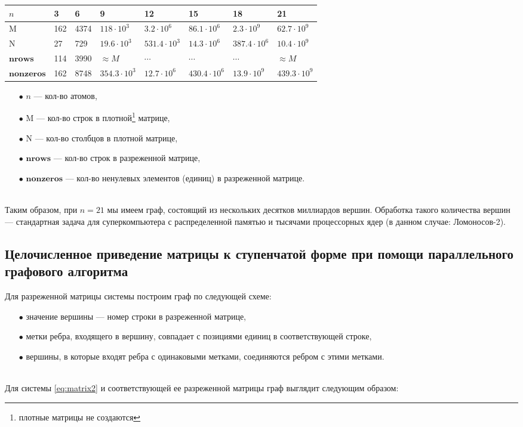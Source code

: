 \noindent
{\footnotesize
	\begin{tabular}[t]{|p{5em}|p{3em}|p{4em}|p{5em}|p{5em}|p{5em}|p{5em}|p{5em}|}
		\hline
		$n$ & 3 & 6 & 9 & 12 & 15 & 18 & 21 \\
		\hline
		$\mathrm{M}$ & 162 & 4374 & $118 \cdot 10^{3}$ & $3.2 \cdot 10^{6}$ & $86.1 \cdot 10^{6}$ & $2.3 \cdot 10^{9}$ & $62.7 \cdot 10^{9}$ \\
		\hline
		$\mathrm{N}$ & 27 & 729 & $19.6 \cdot 10^{3}$ & $531.4 \cdot 10^{3}$ & $14.3 \cdot 10^{6}$ & $387.4 \cdot 10^{6}$ & $10.4 \cdot 10^{9}$ \\
		\hline
		$\mathbf{nrows}$ & 114 & 3990 & $\approx M$ & $\cdots$ & $\cdots$ & $\cdots$ & $\approx M$ \\
		\hline
		$\mathbf{nonzeros}$ & 162 & 8748 & $354.3 \cdot 10^{3}$ & $12.7 \cdot 10^{6}$ & $430.4 \cdot 10^{6}$ & $13.9 \cdot 10^{9}$ & $439.3 \cdot 10^{9}$ \\
		\hline
	\end{tabular}
}

\begin{itemize}
	\item[$\bullet$]{$n$  --- кол-во атомов},
	\item[$\bullet$]{$\mathrm{M}$ --- кол-во строк в плотной\footnote[1]{плотные матрицы не создаются} матрице,}
	\item[$\bullet$]{$\mathrm{N}$ --- кол-во столбцов в плотной матрице,}
	\item[$\bullet$]{$\mathbf{nrows}$  --- кол-во строк в разреженной матрице,}
	\item[$\bullet$]{$\mathbf{nonzeros}$ --- кол-во ненулевых элементов (единиц) в разреженной матрице.}
\end{itemize}
\
\\[0pt]
\noindent Таким образом, при $n = 21$ мы имеем граф, состоящий из нескольких десятков миллиардов вершин. Обработка такого количества вершин --- стандартная задача для суперкомпьютера с распределенной памятью и тысячами процессорных ядер (в данном случае: Ломоносов-2).

\subsection{Целочисленное приведение матрицы к ступенчатой форме при помощи
	параллельного графового алгоритма}\label{subsec:ch4/subsect2}

Для разреженной матрицы системы построим граф по следующей схеме:
\begin{itemize}
	\item[$\bullet$]{значение вершины --- номер строки в разреженной матрице,}
	\item[$\bullet$]{метки ребра, входящего в вершину, совпадает с позициями единиц в соответствующей
		строке,}
	\item[$\bullet$]{вершины, в которые входят ребра с одинаковыми метками, соединяются ребром с этими метками}.
\end{itemize}
\
\\[0pt]
\indent Для системы \eqref{eq:matrix2} и соответствующей ее разреженной матрицы граф выглядит следующим образом:\\[12pt]

